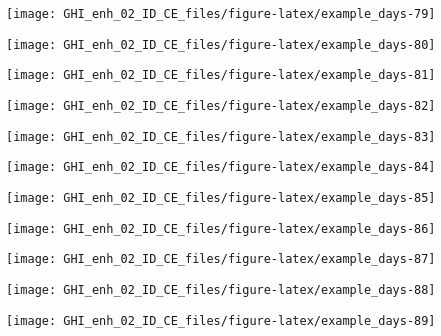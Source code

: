 \documentclass[
  10pt,
  a4paper,oneside]{article}
\begin{document}
\begin{center}\texttt{[image: GHI\_enh\_02\_ID\_CE\_files/figure-latex/example\_days-79]} \end{center}

\begin{center}\texttt{[image: GHI\_enh\_02\_ID\_CE\_files/figure-latex/example\_days-80]} \end{center}

\begin{center}\texttt{[image: GHI\_enh\_02\_ID\_CE\_files/figure-latex/example\_days-81]} \end{center}

\begin{center}\texttt{[image: GHI\_enh\_02\_ID\_CE\_files/figure-latex/example\_days-82]} \end{center}

\begin{center}\texttt{[image: GHI\_enh\_02\_ID\_CE\_files/figure-latex/example\_days-83]} \end{center}

\begin{center}\texttt{[image: GHI\_enh\_02\_ID\_CE\_files/figure-latex/example\_days-84]} \end{center}

\begin{center}\texttt{[image: GHI\_enh\_02\_ID\_CE\_files/figure-latex/example\_days-85]} \end{center}

\begin{center}\texttt{[image: GHI\_enh\_02\_ID\_CE\_files/figure-latex/example\_days-86]} \end{center}

\begin{center}\texttt{[image: GHI\_enh\_02\_ID\_CE\_files/figure-latex/example\_days-87]} \end{center}

\begin{center}\texttt{[image: GHI\_enh\_02\_ID\_CE\_files/figure-latex/example\_days-88]} \end{center}

\begin{center}\texttt{[image: GHI\_enh\_02\_ID\_CE\_files/figure-latex/example\_days-89]} \end{center}
\end{document}
